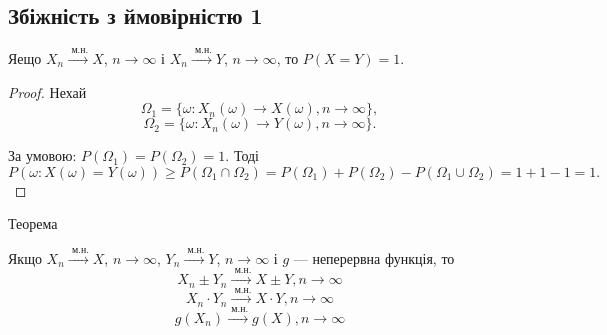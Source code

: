 \subsection{Збіжність з ймовірністю 1}

\begin{theorem}
    Яещо $X_n \xrightarrow{\text{ м.н.}} X$, $n \rightarrow \infty$
    і $X_n \xrightarrow{\text{ м.н.}} Y$, $n \rightarrow \infty$, то
    $P(X = Y) = 1$.
\end{theorem}
\begin{proof}
    Нехай
    $$\Omega_1 = \{\omega: X_n(\omega) \rightarrow X(\omega), n \rightarrow \infty\},$$
    $$\Omega_2 = \{\omega: X_n(\omega) \rightarrow Y(\omega), n \rightarrow \infty\}.$$
    
    За умовою: $P(\Omega_1) = P(\Omega_2) = 1$. Тоді
    $$P(\omega: X(\omega) = Y(\omega))
    \geqslant P(\Omega_1 \cap \Omega_2)
    = P(\Omega_1) + P(\Omega_2) - P(\Omega_1 \cup \Omega_2)
    = 1 + 1 - 1
    = 1.$$
\end{proof}

Теорема
\begin{theorem}
    Якщо $X_n \xrightarrow{\text{ м.н.}} X$, $n \rightarrow \infty$,
    $Y_n \xrightarrow{\text{ м.н.}} Y$, $n \rightarrow \infty$ і
    $g$ --- неперервна функція, то
    $$X_n \pm Y_n \xrightarrow{\text{ м.н.}} X \pm Y, n \rightarrow \infty$$
    $$X_n \cdot Y_n \xrightarrow{\text{ м.н.}} X \cdot Y, n \rightarrow \infty$$
    $$g(X_n) \xrightarrow{\text{ м.н.}} g(X), n \rightarrow \infty$$
\end{theorem}

